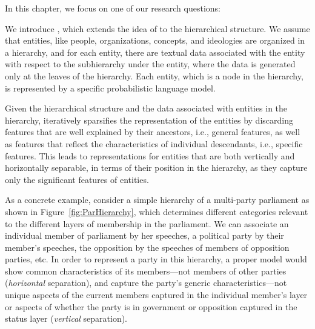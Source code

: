 In this chapter, we focus on one of our research questions:

We introduce \hswlms, which extends the idea of \swlms to the hierarchical structure. We assume that entities, like people, organizations, concepts, and ideologies are organized in a hierarchy, and for each entity, there are textual data associated with the entity with respect to the subhierarchy under the entity, where the data is generated only at the leaves of the hierarchy. Each entity, which is a node in the hierarchy, is represented by a specific probabilistic language model.

Given the hierarchical structure and the data associated with entities in the hierarchy, \achswlm iteratively sparsifies the representation of the entities by discarding features that are well explained by their ancestors, i.e., general features, as well as features that reflect the characteristics of individual descendants, i.e., specific features. This leads to representations for entities that are both vertically and horizontally separable, in terms of their position in the hierarchy, as they capture only the significant features of entities.


As a concrete example, consider a simple hierarchy of a multi\:-\:party parliament as shown in Figure~\ref{fig:ParHierarchy}, which determines different categories relevant to the different layers of membership in the parliament.  We can associate an individual member of parliament by her speeches, a political party by their member's speeches, the opposition by the speeches of members of opposition parties, etc. 
In order to represent a party in this hierarchy, a proper model would show common characteristics of its members\:---\:not members of other parties (\emph{horizontal} separation), and capture the party's generic characteristics\:---\:not unique aspects of the current members captured in the individual member's layer or aspects of whether the party is in government or opposition captured in the status layer (\emph{vertical} separation).

